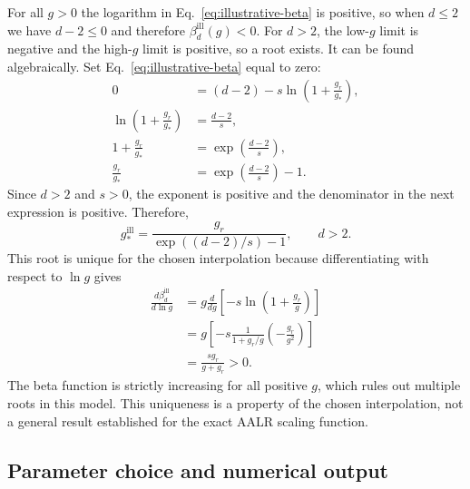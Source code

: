 \documentclass[11pt,a4paper]{article}
\numberwithin{equation}{section}
\begin{document}
For all $g>0$ the logarithm in Eq.~\eqref{eq:illustrative-beta} is positive, so when $d\le2$ we have $d-2\le0$ and therefore $\beta_d^{\mathrm{ill}}(g)<0$. For $d>2$, the low-$g$ limit is negative and the high-$g$ limit is positive, so a root exists. It can be found algebraically. Set Eq.~\eqref{eq:illustrative-beta} equal to zero:
\begin{align}
    0&=(d-2)-s\ln\left(1+\frac{g_r}{g_*}\right),\\
    \ln\left(1+\frac{g_r}{g_*}\right)&=\frac{d-2}{s},\\
    1+\frac{g_r}{g_*}&=\exp\left(\frac{d-2}{s}\right),\\
    \frac{g_r}{g_*}&=\exp\left(\frac{d-2}{s}\right)-1.
\end{align}
Since $d>2$ and $s>0$, the exponent is positive and the denominator in the next expression is positive. Therefore,
\begin{equation}
    \boxed{g_*^{\mathrm{ill}}=\frac{g_r}{\exp((d-2)/s)-1},\qquad d>2.}
    \label{eq:illustrative-root}
\end{equation}
This root is unique for the chosen interpolation because differentiating with respect to $\ln g$ gives
\begin{align}
    \frac{d\beta_d^{\mathrm{ill}}}{d\ln g}
    &=g\frac{d}{dg}\left[-s\ln\left(1+\frac{g_r}{g}\right)\right]\\
    &=g\left[-s\frac{1}{1+g_r/g}\left(-\frac{g_r}{g^2}\right)\right]\\
    &=\frac{s g_r}{g+g_r}>0.
    \label{eq:illustrative-slope}
\end{align}
The beta function is strictly increasing for all positive $g$, which rules out multiple roots in this model. This uniqueness is a property of the chosen interpolation, not a general result established for the exact AALR scaling function.

\subsection{Parameter choice and numerical output}
\end{document}
